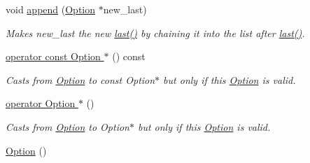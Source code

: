 \begin{DoxyCompactItemize}
void \hyperlink{classxmem_1_1config_1_1third__party_1_1_option_ac8fcf58435fb4e82ce937074af8198ac}{append} (\hyperlink{classxmem_1_1config_1_1third__party_1_1_option}{Option} $\ast$new\-\_\-last)
\begin{DoxyCompactList}\small\item\em Makes {\ttfamily new\-\_\-last} the new \hyperlink{classxmem_1_1config_1_1third__party_1_1_option_a79bd212eaf002df298da1b3b46e34cea}{last()} by chaining it into the list after \hyperlink{classxmem_1_1config_1_1third__party_1_1_option_a79bd212eaf002df298da1b3b46e34cea}{last()}. \end{DoxyCompactList}\item 
\hyperlink{classxmem_1_1config_1_1third__party_1_1_option_ae2be6cea552bb7b55fc4b264f5720911}{operator const Option $\ast$} () const 
\begin{DoxyCompactList}\small\item\em Casts from \hyperlink{classxmem_1_1config_1_1third__party_1_1_option}{Option} to const Option$\ast$ but only if this \hyperlink{classxmem_1_1config_1_1third__party_1_1_option}{Option} is valid. \end{DoxyCompactList}\item 
\hyperlink{classxmem_1_1config_1_1third__party_1_1_option_aca15f5c3126a45ea8e24dae817ebea7d}{operator Option $\ast$} ()
\begin{DoxyCompactList}\small\item\em Casts from \hyperlink{classxmem_1_1config_1_1third__party_1_1_option}{Option} to Option$\ast$ but only if this \hyperlink{classxmem_1_1config_1_1third__party_1_1_option}{Option} is valid. \end{DoxyCompactList}\item 
\hypertarget{classxmem_1_1config_1_1third__party_1_1_option_a49ea7c71e3f980214ad2ef4cca3c6662}{\hyperlink{classxmem_1_1config_1_1third__party_1_1_option_a49ea7c71e3f980214ad2ef4cca3c6662}{Option} ()}\label{classxmem_1_1config_1_1third__party_1_1_option_a49ea7c71e3f980214ad2ef4cca3c6662}


\end{DoxyCompactItemize}
